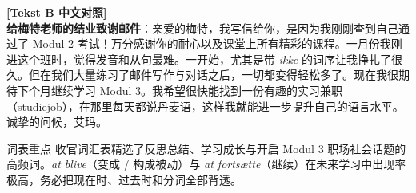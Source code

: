 \begin{transbox}
\small
\textbf{\color{NCDTeal}[Tekst B 中文对照]}\\
\textbf{给梅特老师的结业致谢邮件}：亲爱的梅特，我写信给你，是因为我刚刚查到自己通过了 Modul 2 考试！万分感谢你的耐心以及课堂上所有精彩的课程。一月份我刚进这个班时，觉得发音和从句最难。一开始，尤其是带 \textit{ikke} 的词序让我挣扎了很久。但在我们大量练习了邮件写作与对话之后，一切都变得轻松多了。现在我很期待下个月继续学习 Modul 3。我希望很快能找到一份有趣的实习兼职（studiejob），在那里每天都说丹麦语，这样我就能进一步提升自己的语言水平。诚挚的问候，艾玛。
\end{transbox}


\begin{tipbox}{词表重点}
收官词汇表精选了反思总结、学习成长与开启 Modul 3 职场社会话题的高频词。\textit{at blive}（变成 / 构成被动）与 \textit{at fortsætte}（继续）在未来学习中出现率极高，务必把现在时、过去时和分词全部背透。
\end{tipbox}

